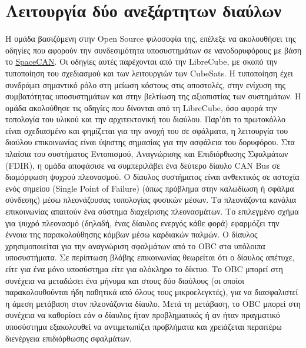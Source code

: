 \documentclass[a4paper,nobib,justified]{tufte-book}
\begin{document}
\section{Λειτουργία δύο ανεξάρτητων διαύλων}
Η ομάδα βασιζόμενη στην Open Source φιλοσοφία της, επέλεξε να ακολουθήσει της οδηγίες που αφορούν την συνδεσιμότητα υποσυστημάτων σε νανοδορυφόρους με βάση το \href{https://librecube.gitlab.io/standards/spacecan}{SpaceCAN}. Οι οδηγίες αυτές παρέχονται από την LibreCube, με σκοπό την τυποποίηση του σχεδιασμού και των λειτουργιών των CubeSats. Η τυποποίηση έχει συνδράμει σημαντικό ρόλο στη μείωση κόστους στις αποστολές, στην ενίχυση της συμβατότητας υποσυστημάτων και στην βελτίωση της αξιοπιστίας των συστημάτων. Η ομάδα ακολούθησε τις οδηγίες που δίνονται από τη LibreCube, όσο αφορά την τοπολογία του υλικού και την αρχιτεκτονική του διαύλου. 
Παρ'ότι το πρωτοκόλλο είναι σχεδιασμένο και φημίζεται για την ανοχή του σε σφάλματα, η λειτουργία του διαύλου επικοινωνίας είναι ύψιστης σημασίας για την ασφάλεια του δορυφόρου. Στα πλαίσια του συστήματος Εντοπισμού, Αναγνώρισης και Επιδιόρθωσης Σφαλμάτων (FDIR), η ομάδα αποφάσισε να συμπεριλάβει ένα δεύτερο δίαυλο CAN Bus σε διαμόρφωση ψυχρού πλεονασμού. Ο δίαυλος συστήματος είναι ανθεκτικός σε αστοχία ενός σημείου (Single Point of Failure) (όπως πρόβλημα στην καλωδίωση ή σφάλμα σύνδεσης) μέσω πλεονάζουσας τοπολογίας φυσικών μέσων. Τα πλεονάζοντα κανάλια επικοινωνίας απαιτούν ένα σύστημα διαχείρισης πλεονασμάτων. Το επιλεγμένο σχήμα για ψυχρό πλεονασμό (δηλαδή, ένας δίαυλος ενεργός κάθε φορά) εφαρμόζει την έννοια της παρακολούθησης κόμβων μέσω καρδιακών παλμών.  Ο δίαυλος χρησιμοποιείται για την αναγνώριση σφαλμάτων από το OBC στα υπόλοιπα υποσυστήματα. Σε περίπτωση βλάβης επικοινωνίας θεωρείται ότι ο δίαυλος απέτυχε, είτε για ένα μόνο υποσύστημα είτε για ολόκληρο το δίκτυο. Το OBC μπορεί στη συνέχεια να μεταδώσει ένα μήνυμα και στους δύο διαύλους (οι οποίοι παρακολουθούνται ήδη παθητικά από όλους τους μικροελεγκτές), για να διασφαλιστεί η άμεση μετάβαση στον πλεονάζοντα δίαυλο. Μετά τη μετάβαση, το OBC μπορεί στη συνέχεια να καθορίσει εάν ο δίαυλος ήταν προβληματικός ή αν ήταν πραγματικό υποσύστημα εξακολουθεί να αντιμετωπίζει προβλήματα και χρειάζεται περαιτέρω διενέργεια επιδιόρθωσης σφαλμάτων.
\end{document}
